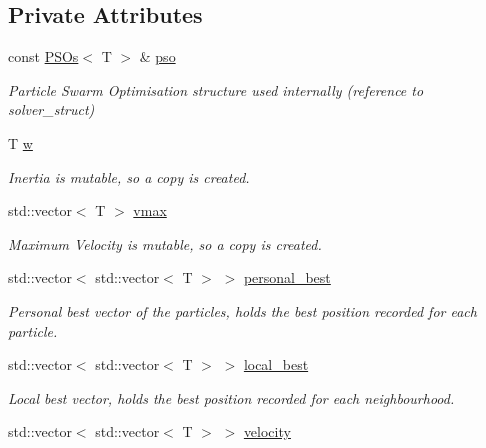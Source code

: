 \subsection*{Private Attributes}
\begin{DoxyCompactItemize}
\item 
const \hyperlink{structea_1_1_p_s_os}{P\+S\+Os}$<$ T $>$ \& \hyperlink{classea_1_1_solver_3_01_p_s_os_00_01_t_00_01_f_00_01_c_01_4_a1f1aa62756a73565ebe0ca1fbc084ea5}{pso}
\begin{DoxyCompactList}\small\item\em Particle Swarm Optimisation structure used internally (reference to solver\+\_\+struct) \end{DoxyCompactList}\item 
T \hyperlink{classea_1_1_solver_3_01_p_s_os_00_01_t_00_01_f_00_01_c_01_4_a4f690e68bf36069ba446ef96b03da6f6}{w}
\begin{DoxyCompactList}\small\item\em Inertia is mutable, so a copy is created. \end{DoxyCompactList}\item 
std\+::vector$<$ T $>$ \hyperlink{classea_1_1_solver_3_01_p_s_os_00_01_t_00_01_f_00_01_c_01_4_ade5fde673b93afeb9e3cb410d6f1061a}{vmax}
\begin{DoxyCompactList}\small\item\em Maximum Velocity is mutable, so a copy is created. \end{DoxyCompactList}\item 
std\+::vector$<$ std\+::vector$<$ T $>$ $>$ \hyperlink{classea_1_1_solver_3_01_p_s_os_00_01_t_00_01_f_00_01_c_01_4_a8a857e38363bd1ed23ea77e262b9b710}{personal\+\_\+best}
\begin{DoxyCompactList}\small\item\em Personal best vector of the particles, holds the best position recorded for each particle. \end{DoxyCompactList}\item 
std\+::vector$<$ std\+::vector$<$ T $>$ $>$ \hyperlink{classea_1_1_solver_3_01_p_s_os_00_01_t_00_01_f_00_01_c_01_4_afa2eb13f0e5028ba4aa96f7e29b62e9c}{local\+\_\+best}
\begin{DoxyCompactList}\small\item\em Local best vector, holds the best position recorded for each neighbourhood. \end{DoxyCompactList}\item 
std\+::vector$<$ std\+::vector$<$ T $>$ $>$ \hyperlink{classea_1_1_solver_3_01_p_s_os_00_01_t_00_01_f_00_01_c_01_4_ac188af95a817ad70538969bd5af2dc66}{velocity}

\end{DoxyCompactItemize}
